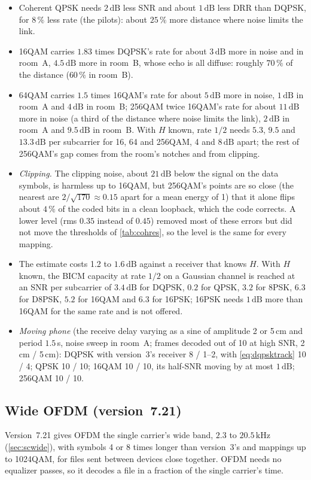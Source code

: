 \documentclass[11pt,a4paper]{article}
\newcommand{\kHz}{\,\mathrm{kHz}}
\newcommand{\dB}{\,\mathrm{dB}}
\theoremstyle{remark}
\begin{document}
\begin{itemize}
\item Coherent QPSK needs $2\dB$ less SNR and about $1\dB$ less DRR than DQPSK, for $8\,\%$ less rate (the pilots): about $25\,\%$ more distance where noise limits the link.
\item 16QAM carries $1.83$ times DQPSK's rate for about $3\dB$ more in noise and in room~A, $4.5\dB$ more in room~B, whose echo is all diffuse: roughly $70\,\%$ of the distance ($60\,\%$ in room~B).
\item 64QAM carries $1.5$ times 16QAM's rate for about $5\dB$ more in noise, $1\dB$ in room~A and $4\dB$ in room~B; 256QAM twice 16QAM's rate for about $11\dB$ more in noise (a third of the distance where noise limits the link), $2\dB$ in room~A and $9.5\dB$ in room~B. With $H$ known, rate $1/2$ needs $5.3$, $9.5$ and $13.3\dB$ per subcarrier for 16, 64 and 256QAM, 4 and $8\dB$ apart; the rest of 256QAM's gap comes from the room's notches and from clipping.
\item \emph{Clipping.} The clipping noise, about $21\dB$ below the signal on the data symbols, is harmless up to 16QAM, but 256QAM's points are so close (the nearest are $2/\sqrt{170} \approx 0.15$ apart for a mean energy of 1) that it alone flips about $4\,\%$ of the coded bits in a clean loopback, which the code corrects. A lower level (rms $0.35$ instead of $0.45$) removed most of these errors but did not move the thresholds of \cref{tab:cohres}, so the level is the same for every mapping.
\item The estimate costs 1.2 to $1.6\dB$ against a receiver that knows $H$. With $H$ known, the BICM capacity at rate $1/2$ on a Gaussian channel is reached at an SNR per subcarrier of $3.4\dB$ for DQPSK, $0.2$ for QPSK, $3.2$ for 8PSK, $6.3$ for D8PSK, $5.2$ for 16QAM and $6.3$ for 16PSK; 16PSK needs $1\dB$ more than 16QAM for the same rate and is not offered.
\item \emph{Moving phone} (the receive delay varying as a sine of amplitude 2 or 5\,cm and period $1.5$\,s, noise sweep in room~A; frames decoded out of 10 at high SNR, 2\,cm / 5\,cm): DQPSK with version~3's receiver 8 / 1--2, with \cref{eq:dqpsktrack} 10 / 4; QPSK 10 / 10; 16QAM 10 / 10, its half-SNR moving by at most $1\dB$; 256QAM 10 / 10.
\end{itemize}

\subsection{Wide OFDM (version~7.21)}
\label{sec:ofdmwide}
Version~7.21 gives OFDM the single carrier's wide band, $2.3$ to $20.5\kHz$ (\cref{sec:scwide}), with symbols 4 or 8 times longer than version~3's and mappings up to 1024QAM, for files sent between devices close together. OFDM needs no equalizer passes, so it decodes a file in a fraction of the single carrier's time.
\end{document}
